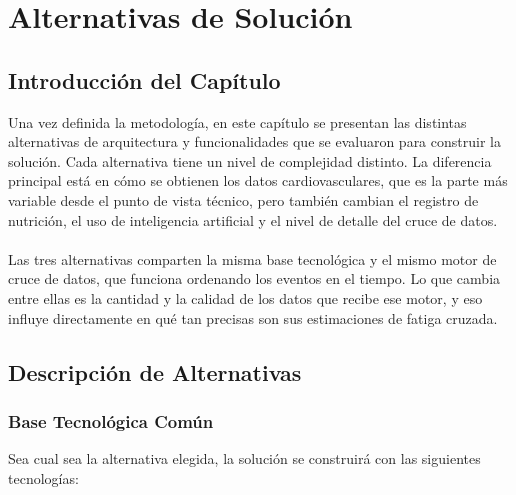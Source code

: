 \section{Alternativas de Solución}
\subsection{Introducción del Capítulo}
Una vez definida la metodología, en este capítulo se presentan las distintas alternativas de arquitectura y funcionalidades que se evaluaron para construir la solución. Cada alternativa tiene un nivel de complejidad distinto. La diferencia principal está en cómo se obtienen los datos cardiovasculares, que es la parte más variable desde el punto de vista técnico, pero también cambian el registro de nutrición, el uso de inteligencia artificial y el nivel de detalle del cruce de datos.
\\\\
Las tres alternativas comparten la misma base tecnológica y el mismo motor de cruce de datos, que funciona ordenando los eventos en el tiempo. Lo que cambia entre ellas es la cantidad y la calidad de los datos que recibe ese motor, y eso influye directamente en qué tan precisas son sus estimaciones de fatiga cruzada.
\subsection{Descripción de Alternativas}
\subsubsection{Base Tecnológica Común}

Sea cual sea la alternativa elegida, la solución se construirá con las siguientes tecnologías:

